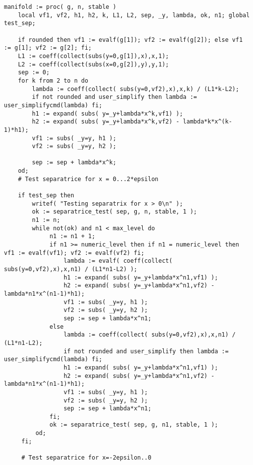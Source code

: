 \documentclass[a4paper,10pt]{article}
\begin{document}
\begin{lstlisting}[name=type]
manifold := proc( g, n, stable )
    local vf1, vf2, h1, h2, k, L1, L2, sep, _y, lambda, ok, n1; global test_sep;

    if rounded then vf1 := evalf(g[1]); vf2 := evalf(g[2]); else vf1 := g[1]; vf2 := g[2]; fi;
    L1 := coeff(collect(subs(y=0,g[1]),x),x,1);
    L2 := coeff(collect(subs(x=0,g[2]),y),y,1);
    sep := 0;
    for k from 2 to n do
        lambda := coeff(collect( subs(y=0,vf2),x),x,k) / (L1*k-L2);
        if not rounded and user_simplify then lambda := user_simplifycmd(lambda) fi;
        h1 := expand( subs( y=_y+lambda*x^k,vf1) );
        h2 := expand( subs( y=_y+lambda*x^k,vf2) - lambda*k*x^(k-1)*h1);
        vf1 := subs( _y=y, h1 );
        vf2 := subs( _y=y, h2 );

        sep := sep + lambda*x^k;
    od;
    # Test separatrice for x = 0...2*epsilon

    if test_sep then
        writef( "Testing separatrix for x > 0\n" );
        ok := separatrice_test( sep, g, n, stable, 1 );
        n1 := n;
        while not(ok) and n1 < max_level do
             n1 := n1 + 1;
             if n1 >= numeric_level then if n1 = numeric_level then vf1 := evalf(vf1); vf2 := evalf(vf2) fi;
                 lambda := evalf( coeff(collect( subs(y=0,vf2),x),x,n1) / (L1*n1-L2) );
                 h1 := expand( subs( y=_y+lambda*x^n1,vf1) );
                 h2 := expand( subs( y=_y+lambda*x^n1,vf2) - lambda*n1*x^(n1-1)*h1);
                 vf1 := subs( _y=y, h1 );
                 vf2 := subs( _y=y, h2 );
                 sep := sep + lambda*x^n1;
             else
                 lambda := coeff(collect( subs(y=0,vf2),x),x,n1) / (L1*n1-L2);
                 if not rounded and user_simplify then lambda := user_simplifycmd(lambda) fi;
                 h1 := expand( subs( y=_y+lambda*x^n1,vf1) );
                 h2 := expand( subs( y=_y+lambda*x^n1,vf2) - lambda*n1*x^(n1-1)*h1);
                 vf1 := subs( _y=y, h1 );
                 vf2 := subs( _y=y, h2 );
                 sep := sep + lambda*x^n1;
             fi;
             ok := separatrice_test( sep, g, n1, stable, 1 );
         od;
     fi;

     # Test separatrice for x=-2epsilon..0


\end{lstlisting}
\end{document}
